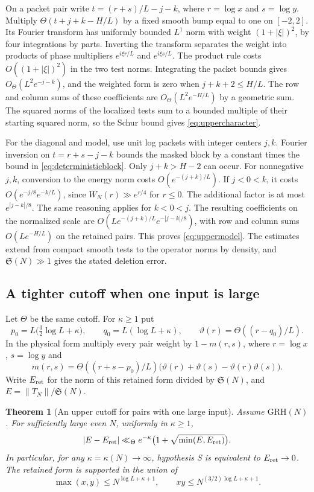 \documentclass[11pt,a4paper]{article}
\numberwithin{equation}{section}
\newtheorem{theorem}{Theorem}[section]
\newcommand{\SSS}{\mathfrak S}
\newcommand{\grh}{\mathrm{GRH}}
\begin{document}
On a packet pair write $t=(r+s)/L-j-k$, where $r=\log x$
and $s=\log y$. Multiply $\Theta(t+j+k-H/L)$ by a
fixed smooth bump equal to one on $[-2,2]$.
Its Fourier transform has uniformly bounded
$L^1$ norm with weight $(1+|\xi|)^2$, by four
integrations by parts. Inverting the transform separates
the weight into products of phase multipliers
$e^{i\xi r/L}$ and $e^{i\xi s/L}$. The product rule costs
$O((1+|\xi|)^2)$ in the two test norms. Integrating the
packet bounds gives $O_\Theta(L^2 e^{-j-k})$, and
the weighted form is zero when $j+k+2\le H/L$.
The row and column sums of these coefficients are
$O_\Theta(L^2 e^{-H/L})$ by a geometric sum.
The squared norms of the localized tests sum to a bounded
multiple of their starting squared norm, so the Schur
bound gives \cref{eq:uppercharacter}.

For the diagonal and model, use unit log packets with integer
centers $j,k$. Fourier inversion on $t=r+s-j-k$ bounds
the masked block by a constant times the bound in
\cref{eq:deterministicblock}. Only $j+k>H-2$ can occur.
For nonnegative $j,k$, conversion to the energy norm
costs $O(e^{-(j+k)/L})$. If $j<0<k$, it costs
$O(e^{-j/8}e^{-k/L})$, since $W_N(r)\gg e^{r/4}$
for $r\le0$. The additional factor is at most $e^{|j-k|/8}$.
The same reasoning applies for $k<0<j$.
The resulting coefficients on the normalized scale are
$O(L e^{-(j+k)/L}e^{-|j-k|/8})$, with row and column sums
$O(L e^{-H/L})$ on the retained pairs.
This proves \cref{eq:uppermodel}. The estimates extend from compact
smooth tests to the operator norms by density, and
$\SSS(N)\gg1$ gives the stated deletion error.

\subsection{A tighter cutoff when one input is large}

Let $\Theta$ be the same cutoff. For $\kappa\ge1$ put
\[
 p_0=L\bigl(\tfrac32\log L+\kappa\bigr),\qquad
 q_0=L(\log L+\kappa),\qquad
 \vartheta(r)=\Theta((r-q_0)/L).
\]
In the physical form multiply every pair weight by $1-m(r,s)$,
where $r=\log x$, $s=\log y$ and
\begin{equation}
 m(r,s)=\Theta((r+s-p_0)/L)
       \bigl(\vartheta(r)+\vartheta(s)-\vartheta(r)\vartheta(s)\bigr).
 \label{eq:asymuppertailmask}
\end{equation}
Write $E_{\rm ret}$ for the norm of this retained form divided
by $\SSS(N)$, and $E=\|T_N\|/\SSS(N)$.

\begin{theorem}[An upper cutoff for pairs with one large input]
\label{thm:asymupperproduct}
Assume $\grh(N)$. For sufficiently large even $N$, uniformly
in $\kappa\ge1$,
\begin{equation}
 |E-E_{\rm ret}|\ll_\Theta
      e^{-\kappa}\bigl(1+\sqrt{\min(E,E_{\rm ret})}\bigr).
 \label{eq:asymupperproduct}
\end{equation}
In particular, for any $\kappa=\kappa(N)\to\infty$, hypothesis S
is equivalent to $E_{\rm ret}\to0$. The retained form is supported
in the union of
\[
 \max(x,y)\le N^{\log L+\kappa+1},
 \qquad
 xy\le N^{(3/2)\log L+\kappa+1}.
\]
\end{theorem}
\end{document}
